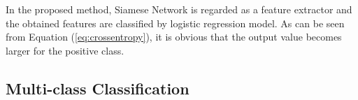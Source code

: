 \documentclass[twocolumn,10pt]{article}
\begin{document}

In the proposed method, Siamese Network is regarded as a feature extractor and the obtained features are classified by logistic regression model.
As can be seen from Equation (\ref{eq:crossentropy}), it is obvious that the output value becomes larger for the positive class.



\subsection{Multi-class Classification}
\end{document}
